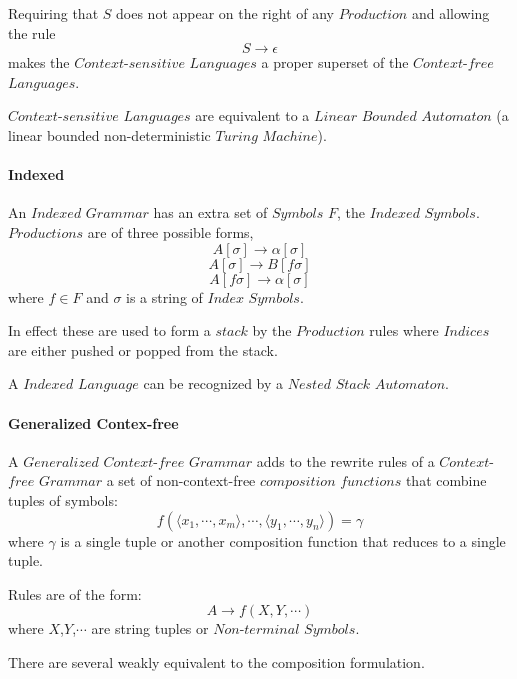 \documentclass{article}
\begin{document}
    Requiring that $S$ does not appear on the right of any
    $Production$ and allowing the rule
    \[
        S \rightarrow \epsilon
    \]
    makes the $Context$-$sensitive$ $Languages$ a proper superset of the
    $Context$-$free$ $Languages$.

    $Context$-$sensitive$ $Languages$ are equivalent to a $Linear$
    $Bounded$ $Automaton$ (a linear bounded non-deterministic $Turing$
    $Machine$).

    \paragraph{Indexed}

    An $Indexed$ $Grammar$ has an extra set of $Symbols$ $F$, the
    $Indexed$ $Symbols$. $Productions$ are of three possible forms,
    \[
        A[\sigma] \rightarrow \alpha[\sigma]
    \]\[
        A[\sigma] \rightarrow B[f\sigma]
    \]\[
        A[f\sigma] \rightarrow \alpha[\sigma]
    \]
    where $f \in F$ and $\sigma$ is a string of $Index$ $Symbols$.

    In effect these are used to form a $stack$ by the $Production$
    rules where $Indices$ are either pushed or popped from the stack.

    A $Indexed$ $Language$ can be recognized by a $Nested$ $Stack$
    $Automaton$.

    \paragraph{Generalized Contex-free}
    A $Generalized$ $Context$-$free$ $Grammar$ adds to the rewrite rules
    of a $Context$-$free$ $Grammar$ a set of non-context-free
    $composition$ $functions$ that combine tuples of symbols:
    \[
        f(\langle x_1,\cdots,x_m\rangle,\cdots,\langle
        y_1,\cdots,y_n\rangle)=\gamma
    \]
    where $\gamma$ is a single tuple or another composition function
    that reduces to a single tuple.

    Rules are of the form:
    \[
        A \rightarrow f(X,Y,\cdots)
    \]
    where $X$,$Y$,$\cdots$ are string tuples or $Non$-$terminal$ $Symbols$.

    There are several weakly equivalent to the composition formulation.
\end{document}
